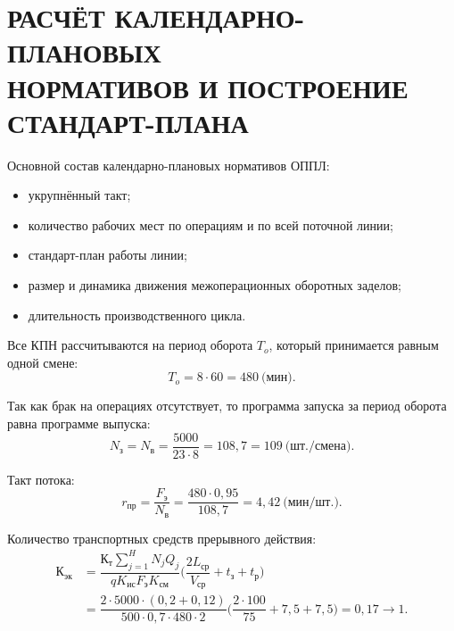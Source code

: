 \section[%
Расчёт календарно-плановых нормативов и построение \\
стандарт-плана]{%
РАСЧЁТ КАЛЕНДАРНО-ПЛАНОВЫХ \\ 
НОРМАТИВОВ И ПОСТРОЕНИЕ \\
СТАНДАРТ-ПЛАНА
}
\label{sec:kpn}

Основной состав календарно-плановых нормативов ОППЛ:
\begin{itemize}
\item укрупнённый такт;
\item количество рабочих мест по операциям и по всей поточной линии;
\item стандарт-план работы линии;
\item размер и динамика движения межоперационных оборотных заделов; 
\item длительность производственного цикла.
\end{itemize}

Все КПН рассчитываются на период оборота \( T_{o} \), который принимается равным
одной смене:
\begin{equation*}
  T_{o} = 8 \cdot 60 = 480 \: \text{(мин)}.
\end{equation*}

Так как брак на операциях отсутствует, 
то программа запуска за период оборота равна программе выпуска:
\begin{equation*}
  N_{\text{з}} = N_{\text{в}} = 
  \dfrac{5000}{23 \cdot 8} = 108{,}7 = 109 \: \text{(шт./смена)}.
\end{equation*}

Такт потока:
\begin{equation*}
  r_{\text{пр}} = \dfrac{F_{\text{э}}}{N_{\text{в}}} = 
  \dfrac{480 \cdot 0{,}95}{108{,}7} = 4{,}42 \: \text{(мин/шт.)}.
\end{equation*}

Количество транспортных средств прерывного действия:
\begin{align*}
\text{К}_{\text{эк}} &= \dfrac{
  \text{К}_{\text{т}} \sum^H_{j=1} N_j Q_j
}{
  q K_{\text{ис}} F_{\text{э}} K_{\text{см}}
} 
\Bigg(  
\dfrac{2 L_{\text{ср}}}{V_{ср}} + t_{\text{з}} + t_{\text{р}}
\Bigg) \\ &= 
\dfrac{
  2 \cdot 5000 \cdot (0{,}2 + 0{,}12)
}{
  500 \cdot 0{,}7 \cdot 480 \cdot 2
}
\Bigg(
\dfrac{2 \cdot 100}{75} + 7{,}5 + 7{,}5
\Bigg) = 0{,}17 \rightarrow 1.
\end{align*}


